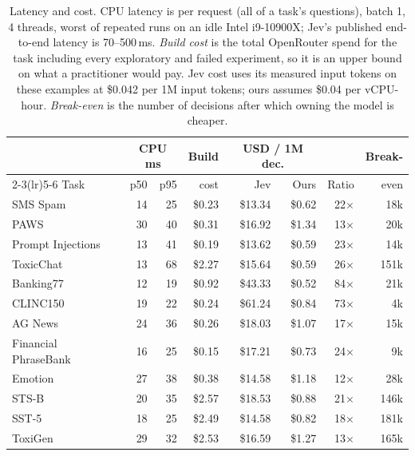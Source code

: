 \begin{table}[t]
\centering\small
\setlength{\tabcolsep}{4pt}
\begin{tabular}{lrrrrrrr}
\toprule
 & \multicolumn{2}{c}{CPU ms} & Build & \multicolumn{2}{c}{USD / 1M dec.} & & Break- \\
\cmidrule(lr){2-3}\cmidrule(lr){5-6}
Task & p50 & p95 & cost & Jev & Ours & Ratio & even \\
\midrule
SMS Spam & 14 & 25 & \$0.23 & \$13.34 & \$0.62 & 22$\times$ & 18k \\
PAWS & 30 & 40 & \$0.31 & \$16.92 & \$1.34 & 13$\times$ & 20k \\
Prompt Injections & 13 & 41 & \$0.19 & \$13.62 & \$0.59 & 23$\times$ & 14k \\
ToxicChat & 13 & 68 & \$2.27 & \$15.64 & \$0.59 & 26$\times$ & 151k \\
Banking77 & 12 & 19 & \$0.92 & \$43.33 & \$0.52 & 84$\times$ & 21k \\
CLINC150 & 19 & 22 & \$0.24 & \$61.24 & \$0.84 & 73$\times$ & 4k \\
AG News & 24 & 36 & \$0.26 & \$18.03 & \$1.07 & 17$\times$ & 15k \\
Financial PhraseBank & 16 & 25 & \$0.15 & \$17.21 & \$0.73 & 24$\times$ & 9k \\
Emotion & 27 & 38 & \$0.38 & \$14.58 & \$1.18 & 12$\times$ & 28k \\
STS-B & 20 & 35 & \$2.57 & \$18.53 & \$0.88 & 21$\times$ & 146k \\
SST-5 & 18 & 25 & \$2.49 & \$14.58 & \$0.82 & 18$\times$ & 181k \\
ToxiGen & 29 & 32 & \$2.53 & \$16.59 & \$1.27 & 13$\times$ & 165k \\
\bottomrule
\end{tabular}
\caption{Latency and cost. CPU latency is per request (all of a task's questions), batch 1, 4 threads, worst of repeated runs on an idle Intel i9-10900X; Jev's published end-to-end latency is 70--500\,ms. \emph{Build cost} is the total OpenRouter spend for the task including every exploratory and failed experiment, so it is an upper bound on what a practitioner would pay. Jev cost uses its measured input tokens on these examples at \$0.042 per 1M input tokens; ours assumes \$0.04 per vCPU-hour. \emph{Break-even} is the number of decisions after which owning the model is cheaper.}
\label{tab:cost}
\end{table}
